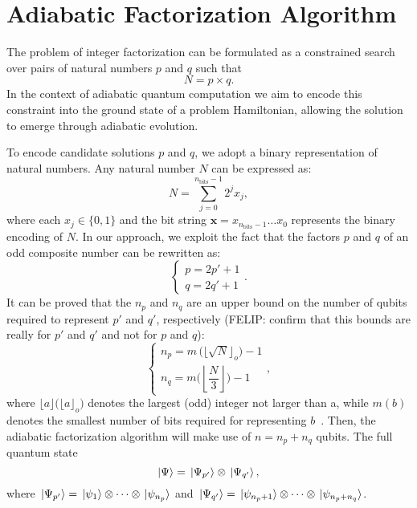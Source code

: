 \section{Adiabatic Factorization Algorithm}
\label{Section:AFA}

The problem of integer factorization can be formulated as a
constrained search over pairs of natural numbers $p$ and $q$
such that
\begin{equation}
	N = p \times q.
	\label{eq:integer_factorization}
\end{equation}
In the context of adiabatic quantum computation we aim to
encode this constraint into the ground state of a problem Hamiltonian,
allowing the solution to emerge through adiabatic evolution.

To encode candidate solutions $p$ and $q$, we adopt a binary representation
of natural numbers. Any natural number $N$ can be expressed as:
\begin{equation}
	N = \sum_{j=0}^{n_\text{bits} - 1} 2^j x_j,
	\label{eq:binary_integer}
\end{equation}
where each $x_j \in \{0,1\}$ and the bit string $\mathbf{x} = x_{n_\text{bits}-1} \dots x_0$
represents the binary encoding of $N$. In our approach, we exploit the fact that the factors
$p$ and $q$ of an odd composite number can be rewritten as:
\begin{equation}
	\begin{cases}
		p = 2p' + 1 \\
		q = 2q' + 1
	\end{cases} .
	\label{eq:factors_simplification}
\end{equation}
It can be proved that the $n_p$ and $n_q$ are an upper bound on the number of qubits
required to represent $p'$ and $q'$, respectively {\color{red}(FELIP: confirm that this bounds are really for $p'$ and $q'$ and not for $p$ and $q$)}:
\begin{equation}
	\begin{cases}
		n_p = m\,\big(\lfloor \sqrt{N} \rfloor_o\big) - 1 \\[2ex]
		n_q = m\bigg(\left\lfloor \dfrac{N}{3} \right\rfloor \bigg) - 1
	\end{cases} ,
	\label{eq:factors_num_bits}
\end{equation}
where $\lfloor a \rfloor \big(\lfloor a \rfloor_o\big)$ denotes the largest (odd)
integer not larger than a, while $m(b)$ denotes the smallest number of bits
required for representing $b$~\cite{peng_quantum_2008}. Then, the adiabatic factorization
algorithm will make use of $n = n_p + n_q$ qubits. The full quantum state 
\begin{equation}
	\ket{\Psi} = \ket*{\Psi_{p'}} \otimes \ket*{\Psi_{q'}},
	\label{eq:full_quantum_state}
\end{equation}
where $\ket*{\Psi_{p'}} = \ket*{\psi_{1}}\otimes \cdots \otimes \ket*{\psi_{n_p}}$
and $\ket*{\Psi_{q'}} = \ket*{\psi_{n_p+1}}\otimes \cdots \otimes \ket*{\psi_{n_p +n_q}}$.

